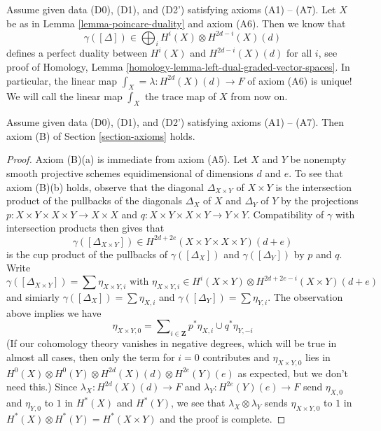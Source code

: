 \begin{remark}
\label{remark-trace}
Assume given data (D0), (D1), and (D2') satisfying axioms (A1) -- (A7).
Let $X$ be as in Lemma \ref{lemma-poincare-duality} and axiom (A6).
Then we know that
$$
\gamma([\Delta]) \in \bigoplus\nolimits_i H^i(X) \otimes H^{2d - i}(X)(d)
$$
defines a perfect duality between $H^i(X)$ and $H^{2d - i}(X)(d)$
for all $i$, see proof of
Homology, Lemma \ref{homology-lemma-left-dual-graded-vector-spaces}.
In particular, the linear map $\int_X = \lambda : H^{2d}(X)(d) \to F$ of
axiom (A6) is unique! We will call the linear map $\int_X$ the trace map
of $X$ from now on.
\end{remark}

\begin{lemma}
\label{lemma-trace-product}
Assume given data (D0), (D1), and (D2') satisfying axioms (A1) -- (A7).
Then axiom (B) of Section \ref{section-axioms} holds.
\end{lemma}

\begin{proof}
Axiom (B)(a) is immediate from axiom (A5).
Let $X$ and $Y$ be nonempty smooth projective schemes equidimensional
of dimensions $d$ and $e$. To see that axiom (B)(b)
holds, observe that the diagonal $\Delta_{X \times Y}$ of $X \times Y$
is the intersection product of the pullbacks of the diagonals
$\Delta_X$ of $X$ and $\Delta_Y$ of $Y$ by the projections
$p : X \times Y \times X \times Y \to X \times X$ and
$q : X \times Y \times X \times Y \to Y \times Y$.
Compatibility of $\gamma$ with intersection products then gives
that
$$
\gamma([\Delta_{X \times Y}]) \in
H^{2d + 2e}(X \times Y \times X \times Y)(d + e)
$$
is the cup product of the pullbacks of $\gamma([\Delta_X])$
and $\gamma([\Delta_Y])$ by $p$ and $q$. Write
$$
\gamma([\Delta_{X \times Y}]) = \sum \eta_{X \times Y, i}
\text{ with }
\eta_{X \times Y, i} \in
H^i(X \times Y) \otimes H^{2d + 2e - i}(X \times Y)(d + e)
$$
and simiarly $\gamma([\Delta_X]) = \sum \eta_{X, i}$ and
$\gamma([\Delta_Y]) = \sum \eta_{Y, i}$. The observation above
implies we have
$$
\eta_{X \times Y, 0} =
\sum\nolimits_{i \in \mathbf{Z}} p^*\eta_{X, i} \cup q^*\eta_{Y, -i}
$$
(If our cohomology theory vanishes in negative degrees, which will
be true in almost all cases, then only the term for $i = 0$ contributes
and $\eta_{X \times Y, 0}$ lies in
$H^0(X) \otimes H^0(Y) \otimes H^{2d}(X)(d) \otimes H^{2e}(Y)(e)$ as expected,
but we don't need this.) Since $\lambda_X : H^{2d}(X)(d) \to F$ and 
$\lambda_Y : H^{2e}(Y)(e) \to F$ send $\eta_{X, 0}$ and $\eta_{Y, 0}$
to $1$ in $H^*(X)$ and $H^*(Y)$, we see that $\lambda_X \otimes \lambda_Y$
sends $\eta_{X \times Y, 0}$ to $1$ in
$H^*(X) \otimes H^*(Y) = H^*(X \times Y)$ and the proof is complete.
\end{proof}

